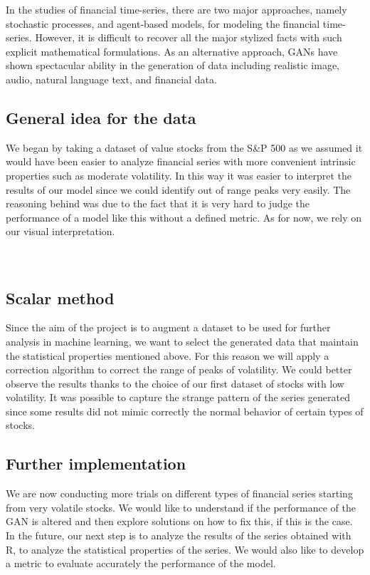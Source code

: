 \documentclass{article}
\begin{document}
    \begin{multicols}{2}

    In the studies of financial time-series, there are two major approaches, namely stochastic processes, and agent-based models, for modeling the financial time-series. However, it is difficult to recover all the major stylized facts with such explicit mathematical formulations. As an alternative approach, GANs have shown spectacular ability in the generation of data including realistic image, audio, natural language text, and financial data.\\
    
    \subsection*{General idea for the data}
    We began by taking a dataset of value stocks from the S\&P 500 as we assumed it would have been easier to analyze financial series with more convenient intrinsic properties such as moderate volatility. In this way it was easier to interpret the results of our model since we could identify out of range peaks very easily. The reasoning behind was due to the fact that it is very hard to judge the performance of a model like this without a defined metric. As for now, we rely on our visual interpretation.\\ \\ \\
    
    \subsection*{Scalar method}
    Since the aim of the project is to augment a dataset to be used for further analysis in machine learning, we want to select the generated data that maintain the statistical properties mentioned above. For this reason we will apply a correction algorithm to correct the range of peaks of volatility. We could better observe the results thanks to the choice of our first dataset of stocks with low volatility. It was possible to capture the strange pattern of the series generated since some results did not mimic correctly  the normal behavior of certain types of stocks.\\ 
    
    \subsection*{Further implementation}
   We are now conducting more trials on different types of financial series starting from very volatile stocks. We would like to understand if the performance of the GAN is altered and then explore solutions on how to fix this, if this is the case.  In the future, our next step is to analyze the results of the series obtained with R, to analyze the statistical properties of the series. We would also like to develop a metric to evaluate accurately the performance of the model.\\


\end{multicols}
\end{document}
